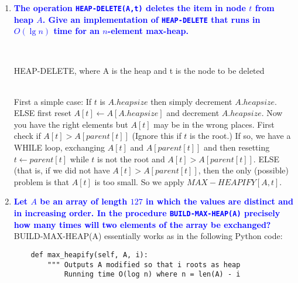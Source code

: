 \documentclass[11pt]{article}
\begin{document}
\begin{enumerate}
\item \textbf{\textcolor{blue}{The operation {\tt HEAP-DELETE(A,t)} deletes the item in node $t$
from heap $A$.  Give an implementation of {\tt HEAP-DELETE} that runs in
$O(\lg n)$ time for an $n$-element max-heap.}}
    \begin{algorithm}
        \Indm{}\\
        \Indp
        \caption{HEAP-DELETE, where A is the heap and t is the node to be deleted}
    \end{algorithm}
    \\ First a simple case: If $t$ is $A.heapsize$ then simply decrement
    $A.heapsize$.  ELSE first reset $A[t]\leftarrow A[A.heapsize]$ and
    decrement $A.heapsize$.  Now you have the right elements but $A[t]$
    may be in the wrong places.  First check if $A[t]> A[parent[t]]$
    (Ignore this if $t$ is the root.)  If so, we have a WHILE loop,
    exchanging $A[t]$ and $A[parent[t]]$ and then resetting $t\leftarrow parent[t]$
    while $t$ is not the root and $A[t]> A[parent[t]]$. ELSE (that is, if
    we did not have $A[t]> A[parent[t]]$, then the only (possible) problem
    is that $A[t]$ is too small.  So we apply $MAX-HEAPIFY[A,t]$.

\item \textbf{\textcolor{blue}{Let $A$ be an array of length $127$ in which the values are distinct and in increasing order. In the procedure {\tt BUILD-MAX-HEAP(A)} precisely how many times will two elements of the array be exchanged?}}
    \\ BUILD-MAX-HEAP(A) essentially works as in the following Python code:
    \begin{verbatim}
    def max_heapify(self, A, i):
        """ Outputs A modified so that i roots as heap
            Running time O(log n) where n = len(A) - i
            

\end{verbatim}
\end{enumerate}
\end{document}
